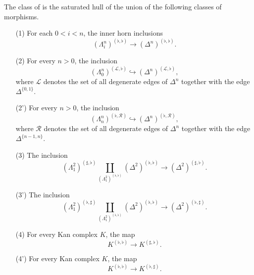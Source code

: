 \documentclass[main.tex]{subfiles}
\begin{document}
\begin{definition}
  The class of  is the saturated hull of the union of the following classes of morphisms.
  \begin{enumerate}
    \item[(1)] For each $0  < i < n$, the inner horn inclusions
      \begin{equation*}
        (\Lambda^{n}_{i})^{(\flat, \flat)} \to (\Delta^{n})^{(\flat, \flat)}.
      \end{equation*}

    \item[(2)] For every $n > 0$, the inclusion
      \begin{equation*}
        (\Lambda^{n}_{0})^{(\mathcal{L}, \flat)} \hookrightarrow (\Delta^{n})^{(\mathcal{L}, \flat)},
      \end{equation*}
      where $\mathcal{L}$ denotes the set of all degenerate edges of $\Delta^{n}$ together with the edge $\Delta^{\{0, 1\}}$.

    \item[(2')] For every $n > 0$, the inclusion
      \begin{equation*}
        (\Lambda^{n}_{n})^{(\flat, \mathcal{R})} \hookrightarrow (\Delta^{n})^{(\flat, \mathcal{R})},
      \end{equation*}
      where $\mathcal{R}$ denotes the set of all degenerate edges of $\Delta^{n}$ together with the edge $\Delta^{\{n-1, n\}}$.

    \item[(3)] The inclusion
      \begin{equation*}
        (\Lambda^{2}_{1})^{(\sharp, \flat)} \coprod_{(\Lambda^{2}_{1})^{(\flat, \flat)}} (\Delta^{2})^{(\flat, \flat)} \to (\Delta^{2})^{(\sharp, \flat)}.
      \end{equation*}

    \item[(3')] The inclusion
      \begin{equation*}
        (\Lambda^{2}_{1})^{(\flat, \sharp)} \coprod_{(\Lambda^{2}_{1})^{(\flat, \flat)}} (\Delta^{2})^{(\flat, \flat)} \to (\Delta^{2})^{(\flat, \sharp)}.
      \end{equation*}

    \item[(4)] For every Kan complex $K$, the map
      \begin{equation*}
        K^{(\flat, \flat)} \to K^{(\sharp, \flat)}.
      \end{equation*}

    \item[(4')] For every Kan complex $K$, the map
      \begin{equation*}
        K^{(\flat, \flat)} \to K^{(\flat, \sharp)}.
      \end{equation*}
  \end{enumerate}
\end{definition}
\end{document}
